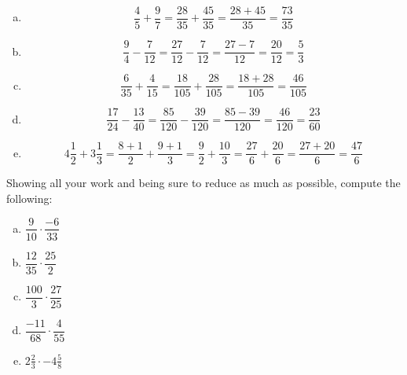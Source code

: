 \documentclass[11pt,letterpaper]{article}
\begin{document}
\sol
\begin{enumerate}[(a)]
\item 
	\[
	\dfrac{4}{5} + \dfrac{9}{7}= \dfrac{28}{35} + \dfrac{45}{35}= \dfrac{28 + 45}{35}= \dfrac{73}{35}
	\] \pspace

\item
	\[
	\dfrac{9}{4} - \dfrac{7}{12}= \dfrac{27}{12} - \dfrac{7}{12}= \dfrac{27 - 7}{12}= \dfrac{20}{12}= \dfrac{5}{3}
	\] \pspace
 
\item 
	\[
	\dfrac{6}{35} + \dfrac{4}{15}= \dfrac{18}{105} + \dfrac{28}{105}= \dfrac{18 + 28}{105}= \dfrac{46}{105}
	\] \pspace

\item 
	\[
	\dfrac{17}{24} - \dfrac{13}{40}= \dfrac{85}{120} - \dfrac{39}{120}= \dfrac{85 - 39}{120}= \dfrac{46}{120}= \dfrac{23}{60}
	\] \pspace

\item 
	\[
	4\frac{1}{2} + 3\frac{1}{3}= \dfrac{8 + 1}{2} + \dfrac{9 + 1}{3}= \dfrac{9}{2} + \dfrac{10}{3}= \dfrac{27}{6} + \dfrac{20}{6}= \dfrac{27 + 20}{6}= \dfrac{47}{6}
	\]
\end{enumerate}



\newpage



 Showing all your work and being sure to reduce as much as possible, compute the following:
\begin{enumerate}[(a)]
\item $\dfrac{9}{10} \cdot \dfrac{-6}{33}$
\item $\dfrac{12}{35} \cdot \dfrac{25}{2}$
\item $\dfrac{100}{3} \cdot \dfrac{27}{25}$
\item $\dfrac{-11}{68} \cdot \dfrac{4}{55}$
\item $2 \frac{2}{3} \cdot -4 \frac{5}{8}$
\end{enumerate} \pspace
\end{document}
